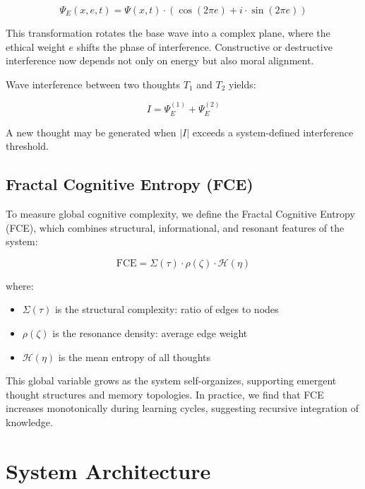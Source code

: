 \documentclass{article}
\begin{document}
\begin{equation}
\Psi_E(x, e, t) = \Psi(x, t) \cdot \left( \cos(2\pi e) + i \cdot \sin(2\pi e) \right)
\end{equation}

\noindent This transformation rotates the base wave into a complex plane, where the ethical weight $e$ shifts the phase of interference. Constructive or destructive interference now depends not only on energy but also moral alignment.

Wave interference between two thoughts $T_1$ and $T_2$ yields:

\begin{equation}
I = \Psi_E^{(1)} + \Psi_E^{(2)}
\end{equation}

\noindent A new thought may be generated when $|I|$ exceeds a system-defined interference threshold.

\subsection{Fractal Cognitive Entropy (FCE)}

To measure global cognitive complexity, we define the Fractal Cognitive Entropy (FCE), which combines structural, informational, and resonant features of the system:

\begin{equation}
\mathrm{FCE} = \Sigma(\tau) \cdot \rho(\zeta) \cdot \mathcal{H}(\eta)
\end{equation}

\noindent where:

\begin{itemize}
    \item $\Sigma(\tau)$ is the structural complexity: ratio of edges to nodes
    \item $\rho(\zeta)$ is the resonance density: average edge weight
    \item $\mathcal{H}(\eta)$ is the mean entropy of all thoughts
\end{itemize}

This global variable grows as the system self-organizes, supporting emergent thought structures and memory topologies. In practice, we find that FCE increases monotonically during learning cycles, suggesting recursive integration of knowledge.

\section{System Architecture}
\end{document}
